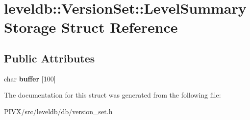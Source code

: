 \hypertarget{structleveldb_1_1_version_set_1_1_level_summary_storage}{}\section{leveldb\+:\+:Version\+Set\+:\+:Level\+Summary\+Storage Struct Reference}
\label{structleveldb_1_1_version_set_1_1_level_summary_storage}
\subsection*{Public Attributes}
\begin{DoxyCompactItemize}
\item 
\mbox{\label{structleveldb_1_1_version_set_1_1_level_summary_storage_a90b283461affa0f25f41bc21a9c81bbc}} 
char {\bfseries buffer} \mbox{[}100\mbox{]}
\end{DoxyCompactItemize}


The documentation for this struct was generated from the following file\+:\begin{DoxyCompactItemize}
\item 
P\+I\+V\+X/src/leveldb/db/version\+\_\+set.\+h\end{DoxyCompactItemize}
